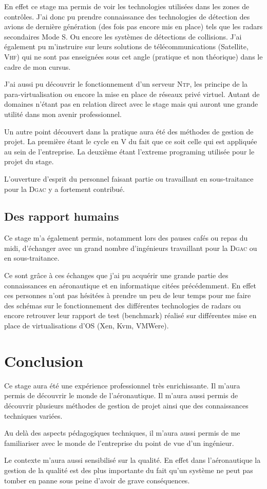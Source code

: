 En effet ce stage ma permis de voir les technologies utilisées dans les zones de contrôles. J'ai donc pu prendre connaissance des technologies de détection des avions de dernière génération (des fois pas encore mis en place) tels que les radars secondaires Mode S. Ou encore les systèmes de détections de collisions. J'ai également pu m'instruire sur leurs solutions de télécommunications (Satellite, \textsc{Vhf}) qui ne sont pas enseignées sous cet angle (pratique et non théorique) dans le cadre de mon cursus.

J'ai aussi pu découvrir le fonctionnement d'un serveur \textsc{Ntp}, les principe de la para-virtualisation ou encore la mise en place de réseaux privé virtuel. Autant de domaines n'étant pas en relation direct avec le stage mais qui auront une grande utilité dans mon avenir professionnel. 

Un autre point découvert dans la pratique aura été des méthodes de gestion de projet. La première étant le cycle en V du fait que ce soit celle qui est appliquée au sein de l'entreprise. La deuxième étant l'extreme programing utilisée pour le projet du stage.

L'ouverture d'esprit du personnel faisant partie ou travaillant en sous-traitance pour la \textsc{Dgac} y a fortement contribué. 

    \subsection{Des rapport humains}
Ce stage m'a également permis, notamment lors des pauses cafés ou repas du midi, d'échanger avec un grand nombre d'ingénieurs travaillant pour la \textsc{Dgac} ou en sous-traitance. 

Ce sont grâce à ces échanges que j'ai pu acquérir une grande partie des connaissances en aéronautique et en informatique citées précédemment. En effet ces personnes n'ont pas hésitées à prendre un peu de leur temps pour me faire des schémas sur le fonctionnement des différentes technologies de radars ou encore retrouver leur rapport de test (benchmark) réalisé sur différentes mise en place de virtualisations d'OS (Xen, Kvm, VMWere). 

\section{Conclusion}
Ce stage aura été une expérience professionnel très enrichissante. Il m'aura permis de découvrir le monde de l'aéronautique. Il m'aura aussi permis de découvrir plusieurs méthodes de gestion de projet ainsi que des connaissances techniques variées.

Au delà des aspects pédagogiques techniques, il m'aura aussi permis de me familiariser avec le monde de l'entreprise du point de vue d'un ingénieur. 

Le contexte m'aura aussi sensibilisé sur la qualité. En effet dans l'aéronautique la gestion de la qualité est des plus importante du fait qu'un système ne peut pas tomber en panne sous peine d'avoir de grave conséquences. 
 









